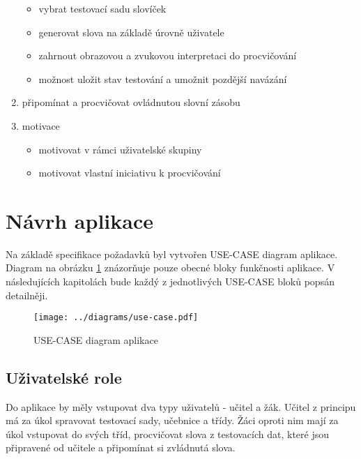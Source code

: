 \documentclass[a4paper,11pt,titlepage,fleqn]{article}
\begin{document}
\begin{enumerate}
\begin{itemize}
                    \item vybrat testovací sadu slovíček
                    \item generovat slova na základě úrovně uživatele
                    \item zahrnout obrazovou a zvukovou interpretaci do procvičování
                    \item možnost uložit stav testování a umožnit pozdější navázání
                \end{itemize}
            \item připomínat a procvičovat ovládnutou slovní zásobu 
            \item motivace
                \begin{itemize}
                    \item motivovat v rámci uživatelské skupiny
                    \item motivovat vlastní iniciativu k procvičování
                \end{itemize}
        \end{enumerate}


\newpage
\section{Návrh aplikace}
    Na základě specifikace požadavků byl vytvořen USE-CASE diagram aplikace. Diagram na obrázku \ref{fig:use-case} znázorňuje pouze obecné bloky funkčnosti aplikace. V následujících kapitolách bude každý z jednotlivých USE-CASE bloků popsán detailněji.

        \begin{figure}[ht!]
            \centering
            \texttt{[image: ../diagrams/use-case.pdf]}
            \caption{USE-CASE diagram aplikace}
            \label{fig:use-case}
        \end{figure}

    \subsection{Uživatelské role}
        Do aplikace by měly vstupovat dva typy uživatelů - učitel a žák. Učitel z principu má za úkol spravovat testovací sady, učebnice a třídy. Žáci oproti nim mají za úkol vstupovat do svých tříd, procvičovat slova z testovacích dat, které jsou připravené od učitele a připomínat si zvládnutá slova. 
\end{document}
